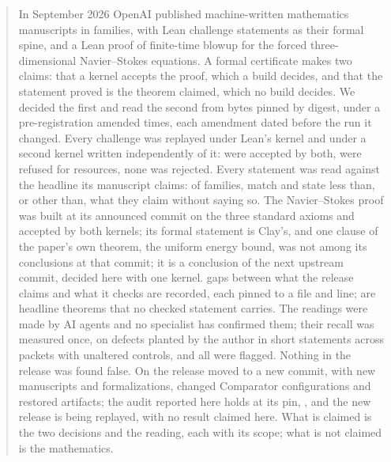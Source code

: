 \documentclass[preprint,11pt,authoryear,a4paper]{elsarticle}
\begin{document}
\begin{frontmatter}
\begin{abstract}
In September 2026 OpenAI published \MtOaManuscripts{} machine-written mathematics manuscripts in \MtOaFamilies{} families, with \MtOaChallenges{} Lean challenge statements as their formal spine, and a Lean proof of finite-time blowup for the forced three-dimensional Navier--Stokes equations. A formal certificate makes two claims: that a kernel accepts the proof, which a build decides, and that the statement proved is the theorem claimed, which no build decides. We decided the first and read the second from bytes pinned by digest, under a pre-registration amended \OmAmendments{} times, each amendment dated before the run it changed. Every challenge was replayed under Lean's kernel and under a second kernel written independently of it: \MtOaCertified{} were accepted by both, \MtOaRefused{} were refused for resources, none was rejected. Every statement was read against the headline its manuscript claims: of \MtOaStatements{} families, \MtOaMatches{} match and \MtOaShort{} state less than, or other than, what they claim without saying so. The Navier--Stokes proof was built at its announced commit on the three standard axioms and accepted by both kernels; its formal statement is Clay's, and one clause of the paper's own theorem, the uniform energy bound, was not among its conclusions at that commit; it is a conclusion of the next upstream commit, decided here with one kernel. \MtOaGaps{} gaps between what the release claims and what it checks are recorded, each pinned to a file and line; \MtOaGapsSevOne{} are headline theorems that no checked statement carries. The readings were made by AI agents and no specialist has confirmed them; their recall was measured once, on \MtRrPlants{} defects planted by the author in short statements across \MtRrPackets{} packets with \MtRrControls{} unaltered controls, and all \MtRrFlagged{} were flagged. Nothing in the release was found false. On \OmNextDate{} the release moved to a new commit, with new manuscripts and formalizations, changed Comparator configurations and restored artifacts; the audit reported here holds at its pin, \MtOaCommit, and the new release is being replayed, with no result claimed here. What is claimed is the two decisions and the reading, each with its scope; what is not claimed is the mathematics.
\end{abstract}


\end{frontmatter}
\end{document}
